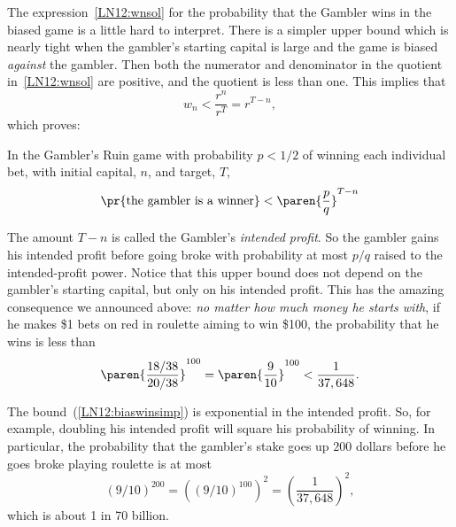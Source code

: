 \begin{example}

The expression~\eqref{LN12:wnsol} for the probability that the Gambler wins
in the biased game is a little hard to interpret.  There is a simpler
upper bound which is nearly tight when the gambler's starting capital is
large and the game is biased {\em against} the
gambler.  Then both the numerator and denominator in the quotient
in~\eqref{LN12:wnsol} are positive, and the quotient is less than one.  This
implies that
\[
w_n < \frac{r^n}{r^T} = r^{T-n}, 
\]
which proves:
\begin{corollary}\label{LN12:biaswincor}
  In the Gambler's Ruin game with probability $p< 1/2$ of winning each
  individual bet, with initial capital, $n$, and target, $T$,
\begin{equation}\label{LN12:biaswinsimp}
\pr{\text{the gambler is a winner}} < \paren{\frac{p}{q}}^{T-n}
\end{equation}
\end{corollary}

The amount $T-n$ is called the Gambler's \emph{intended profit}.  So the
gambler gains his intended profit before going broke with probability at
most $p/q$ raised to the intended-profit power.  Notice that this upper
bound does not depend on the gambler's starting capital, but only on his
intended profit.  This has the amazing consequence we announced above:
\emph{no matter how much money he starts with}, if he
makes \$1 bets on red in roulette aiming to win \$100, the
probability that he wins is less than
\[
\paren{\frac{18/38}{20/38}}^{100} = \paren{\frac{9}{10}}^{100} < \frac{1}{37,648}.
\]

The bound~(\ref{LN12:biaswinsimp}) is exponential in the intended profit.  So,
for example, doubling his intended profit will square his probability of
winning.  In particular, the probability that the gambler's stake goes up
$200$ dollars before he goes broke playing roulette is at most
\[
(9/10)^{200} = ((9/10)^{100})^2 = \left(\frac{1}{37,648}\right)^2,
\]
which is about 1 in 70 billion.

\iffalse


\end{example}
